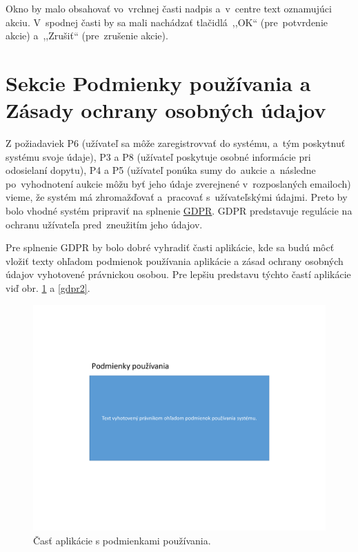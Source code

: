 Okno by malo obsahovať vo~vrchnej časti nadpis a~v~centre text oznamujúci akciu. V~spodnej časti by sa mali nachádzať tlačidlá~,,OK`` (pre~potvrdenie akcie) a~,,Zrušiť`` (pre~zrušenie akcie).

\section{Sekcie Podmienky používania a Zásady ochrany osobných údajov}
\label{gdpr}

Z požiadaviek P6 (užívateľ sa môže zaregistrovvať do systému, a~tým poskytnuť systému svoje údaje), P3 a P8 (užívateľ poskytuje osobné informácie pri odosielaní dopytu), P4 a P5 (užívateľ ponúka sumy do~aukcie a~následne po~vyhodnotení aukcie môžu byť jeho údaje zverejnené v~rozposlaných emailoch) vieme, že systém má zhromažďovať a~pracovať s~užívateľskými údajmi. Preto by bolo vhodné systém pripraviť na splnenie \href{https://www.uoou.cz/obecne-narizeni-o-ochrane-osobnich-udaju-gdpr/ds-3938/p1=3938}{GDPR}. GDPR predstavuje regulácie na ochranu užívateľa pred~zneužitím jeho údajov.

Pre splnenie GDPR by bolo dobré vyhradiť časti aplikácie, kde sa budú môcť vložiť texty ohľadom podmienok používania aplikácie a zásad ochrany osobných údajov vyhotovené právnickou osobou. Pre lepšiu predstavu týchto častí aplikácie viď obr. \ref{gdpr1} a \ref{gdpr2}.

\begin{figure}[H]\centering
\includegraphics[width=140mm]{../img/UI concept/gdpr1}
\caption{Časť aplikácie s podmienkami používania.}
\label{gdpr1}
\end{figure}

